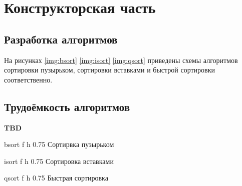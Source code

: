 \chapter{Конструкторская часть}

\section{Разработка алгоритмов}

На рисунках \ref{img:bsort} \ref{img:isort} \ref{img:qsort} приведены схемы алгоритмов сортировки пузырьком, сортировки вставками и быстрой сортировки соответственно.

\section{Трудоёмкость алгоритмов}

\textbf{TBD}

\clearpage

{bsort} %
{f} %
{h} %
{0.75\textwidth} %
{Сортирвка пузырьком} %
\clearpage

{isort} %
{f} %
{h} %
{0.75\textwidth} %
{Сортировка вставками} %
\clearpage

{qsort} %
{f} %
{h} %
{0.75\textwidth} %
{Быстрая сортировка} %
\clearpage